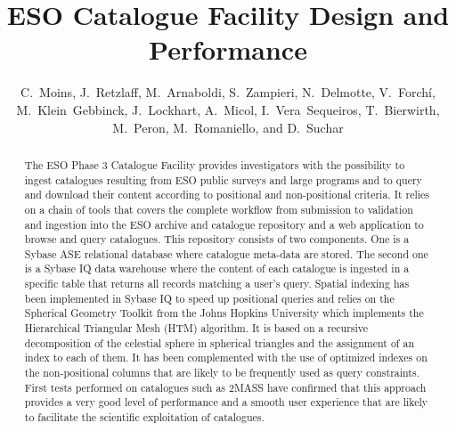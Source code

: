 
\resetcounters




\title{ESO Catalogue Facility Design and Performance}
\author{C.~Moins, J.~Retzlaff, M.~Arnaboldi, S.~Zampieri, N.~Delmotte, V.~Forch\'{i}, M.~Klein~Gebbinck, J.~Lockhart, A.~Micol, I.~Vera~Sequeiros, T.~Bierwirth, M.~Peron, M.~Romaniello, and D.~Suchar
}


\begin{abstract}
The ESO Phase 3 Catalogue Facility provides investigators with the possibility to ingest catalogues resulting from ESO public surveys and large programs and to query and download their content according to positional and non-positional criteria. It relies on a chain of tools that covers the complete workflow from  submission to validation and ingestion into the ESO archive and catalogue repository and a web application to browse and query catalogues. This repository consists of two components. One is a Sybase ASE relational database where catalogue meta-data are stored. The second one is a Sybase IQ data warehouse where the content of each catalogue is ingested in a specific table that returns all records matching a user's query. Spatial indexing has been implemented in Sybase IQ to speed up positional queries and relies on the Spherical Geometry Toolkit from the Johns Hopkins University which implements the Hierarchical Triangular Mesh (HTM) algorithm. It is based on a recursive decomposition of the celestial sphere in spherical triangles and the assignment of an index to each of them. It has been complemented with the use of optimized indexes on the non-positional columns that are likely to be frequently used as query constraints. First tests performed on catalogues such as 2MASS have confirmed that this approach provides a very good level of performance and a smooth user experience that are likely to facilitate the scientific exploitation of catalogues.
\end{abstract}

